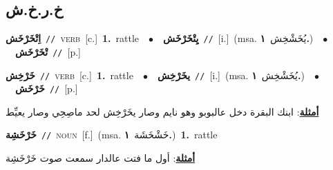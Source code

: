 \documentclass[10pt,a4paper,twoside]{article} %
\begin{document}
\begin{multicols}{2}
{{{{{{{{{{{{{\vspace{-3mm}
\subsection*{\color{blue}\foreignlanguage{arabic}{خ.ر.خ.ش}\color{blue}{}} 

{\setlength\topsep{0pt}\textbf{\foreignlanguage{arabic}{اِتْخَرْخَش}}\ {\color{gray}\texttt{//}\color{black}}\ \textsc{verb}\ [c.]\ \textbf{1.}~rattle\ \ $\bullet$\ \ \setlength\topsep{0pt}\textbf{\foreignlanguage{arabic}{يِتْخَرْخَش}}\ {\color{gray}\texttt{//}\color{black}}\ [i.]\ \color{gray}(msa. \foreignlanguage{arabic}{يُخَشْخِش}~\foreignlanguage{arabic}{\textbf{١.}})\color{black}\ \ $\bullet$\ \ \setlength\topsep{0pt}\textbf{\foreignlanguage{arabic}{تْخَرْخَش}}\ {\color{gray}\texttt{//}\color{black}}\ [p.]\ 

{\setlength\topsep{0pt}\textbf{\foreignlanguage{arabic}{خَرْخِش}}\ {\color{gray}\texttt{//}\color{black}}\ \textsc{verb}\ [c.]\ \textbf{1.}~rattle\ \ $\bullet$\ \ \setlength\topsep{0pt}\textbf{\foreignlanguage{arabic}{يخَرْخِش}}\ {\color{gray}\texttt{//}\color{black}}\ [i.]\ \color{gray}(msa. \foreignlanguage{arabic}{يُخَشْخِش}~\foreignlanguage{arabic}{\textbf{١.}})\color{black}\ \ $\bullet$\ \ \setlength\topsep{0pt}\textbf{\foreignlanguage{arabic}{خَرْخَش}}\ {\color{gray}\texttt{//}\color{black}}\ [p.]\  \begin{flushright}\color{gray}\foreignlanguage{arabic}{\textbf{\underline{\foreignlanguage{arabic}{أمثلة}}}: ابنك البقرة دخل عالبوبو وهو نايم وصار يخَرْخِش لحد ماصِحِي وصار يعيِّط}\end{flushright}\color{black}} \vspace{2mm}

{\setlength\topsep{0pt}\textbf{\foreignlanguage{arabic}{خَرْخَشِة}}\ {\color{gray}\texttt{//}\color{black}}\ \textsc{noun}\ [f.]\ \color{gray}(msa. \foreignlanguage{arabic}{خَشْخَشَة}~\foreignlanguage{arabic}{\textbf{١.}})\color{black}\ \textbf{1.}~rattle\  \begin{flushright}\color{gray}\foreignlanguage{arabic}{\textbf{\underline{\foreignlanguage{arabic}{أمثلة}}}: أول ما فتت عالدار سمعت صوت خَرْخَشِة}\end{flushright}\color{black}} \vspace{2mm}

}}}}}}}}}}}}}}
\end{multicols}
\end{document}
